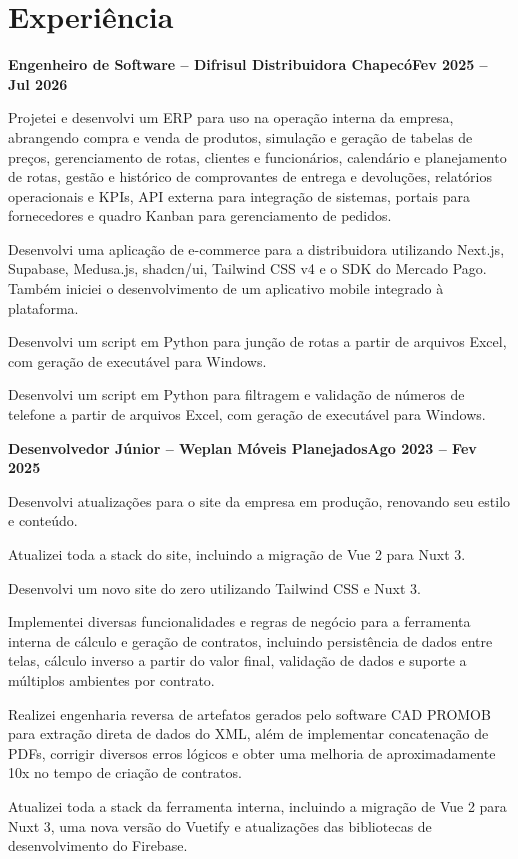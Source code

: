 \documentclass[a4paper,10pt]{article}
\newcommand{\heading}[2]{
\hspace{10pt}#1\hfill#2\\
}
\newcommand{\headingBf}[2]{
\heading{\textbf{#1}}{\textbf{#2}}
}
\newenvironment{resume_list}{
\vspace{-7pt}
\begin{itemize}[itemsep=-2px, parsep=1pt, leftmargin=30pt]
}{
\end{itemize}
}
\begin{document}
\section{Experiência}


\headingBf{Engenheiro de Software -- Difrisul Distribuidora Chapecó}{Fev 2025 -- Jul 2026}
\begin{resume_list}
\item Projetei e desenvolvi um ERP para uso na operação interna da empresa, abrangendo compra e venda de produtos, simulação e geração de tabelas de preços, gerenciamento de rotas, clientes e funcionários, calendário e planejamento de rotas, gestão e histórico de comprovantes de entrega e devoluções, relatórios operacionais e KPIs, API externa para integração de sistemas, portais para fornecedores e quadro Kanban para gerenciamento de pedidos.
\item Desenvolvi uma aplicação de e-commerce para a distribuidora utilizando Next.js, Supabase, Medusa.js, shadcn/ui, Tailwind CSS v4 e o SDK do Mercado Pago. Também iniciei o desenvolvimento de um aplicativo mobile integrado à plataforma.
\item Desenvolvi um script em Python para junção de rotas a partir de arquivos Excel, com geração de executável para Windows.
\item Desenvolvi um script em Python para filtragem e validação de números de telefone a partir de arquivos Excel, com geração de executável para Windows.
\end{resume_list}

\headingBf{Desenvolvedor Júnior -- Weplan Móveis Planejados}{Ago 2023 -- Fev 2025}
\begin{resume_list}
\item Desenvolvi atualizações para o site da empresa em produção, renovando seu estilo e conteúdo.
\item Atualizei toda a stack do site, incluindo a migração de Vue 2 para Nuxt 3.
\item Desenvolvi um novo site do zero utilizando Tailwind CSS e Nuxt 3.
\item Implementei diversas funcionalidades e regras de negócio para a ferramenta interna de cálculo e geração de contratos, incluindo persistência de dados entre telas, cálculo inverso a partir do valor final, validação de dados e suporte a múltiplos ambientes por contrato.
\item Realizei engenharia reversa de artefatos gerados pelo software CAD PROMOB para extração direta de dados do XML, além de implementar concatenação de PDFs, corrigir diversos erros lógicos e obter uma melhoria de aproximadamente 10x no tempo de criação de contratos.
\item Atualizei toda a stack da ferramenta interna, incluindo a migração de Vue 2 para Nuxt 3, uma nova versão do Vuetify e atualizações das bibliotecas de desenvolvimento do Firebase.
\end{resume_list}
\end{document}
